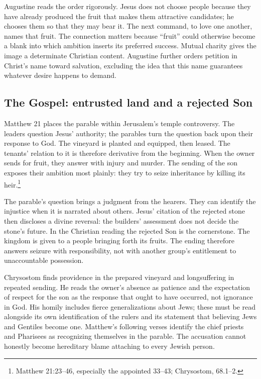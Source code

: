 Augustine reads the order rigorously. Jesus does not choose people because they have already produced the fruit that makes them attractive candidates; he chooses them so that they may bear it. The next command, to love one another, names that fruit. The connection matters because ``fruit'' could otherwise become a blank into which ambition inserts its preferred success. Mutual charity gives the image a determinate Christian content. Augustine further orders petition in Christ's name toward salvation, excluding the idea that this name guarantees whatever desire happens to demand.

\subsection{The Gospel: entrusted land and a rejected Son}
Matthew 21 places the parable within Jerusalem's temple controversy. The leaders question Jesus' authority; the parables turn the question back upon their response to God. The vineyard is planted and equipped, then leased. The tenants' relation to it is therefore derivative from the beginning. When the owner sends for fruit, they answer with injury and murder. The sending of the son exposes their ambition most plainly: they try to seize inheritance by killing its heir.\footnote{Matthew 21:23--46, especially the appointed 33--43; Chrysostom,  68.1--2.}

The parable's question brings a judgment from the hearers. They can identify the injustice when it is narrated about others. Jesus' citation of the rejected stone then discloses a divine reversal: the builders' assessment does not decide the stone's future. In the Christian reading the rejected Son is the cornerstone. The kingdom is given to a people bringing forth its fruits. The ending therefore answers seizure with responsibility, not with another group's entitlement to unaccountable possession.

Chrysostom finds providence in the prepared vineyard and longsuffering in repeated sending. He reads the owner's absence as patience and the expectation of respect for the son as the response that ought to have occurred, not ignorance in God. His homily includes fierce generalizations about Jews; these must be read alongside its own identification of the rulers and its statement that believing Jews and Gentiles become one. Matthew's following verses identify the chief priests and Pharisees as recognizing themselves in the parable. The accusation cannot honestly become hereditary blame attaching to every Jewish person.

